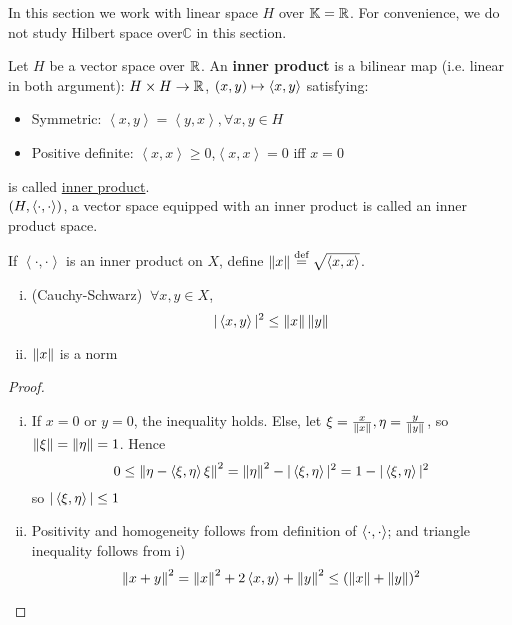 \documentclass{article}
\begin{document}
In this section we work with linear space $H$ over $\mathbb{K} = \mathbb{R}$. For convenience, we do not study Hilbert space over$\mathbb{ C}$ in this section.


\begin{definition}
	Let $H$ be a vector space over $\mathbb{R}$. An {\bf inner product} is a bilinear map (i.e. linear in both argument):
	$H\times H\to\mathbb{R}$, $(x,y)\mapsto \left<{x},{y}\right>$ satisfying:
	\begin{itemize}
		\item Symmetric: $\left<x,y\right>={{\left<y,x\right>}},\forall x,y\in H$
		\item Positive definite: $\left<x,x\right>\geq0$,$\left<x,x\right>=0$ iff $x=0$
	\end{itemize}
	is called \underline{inner product}.\\
	$(H,\left<{\cdot},{\cdot}\right>)$, a vector space equipped with an inner product is called an inner product space.
\end{definition}



\begin{theorem}
	If $\left<\cdot,\cdot\right>$ is an inner product on $X$, define $\left\|{x}\right\|\overset{\textrm{def}}{=}\sqrt{\left<{x},{x}\right>}$.
	\begin{enumerate}[i)]
		\item (Cauchy-Schwarz) $\ \forall x,y\in X$,
		      $$|\left<{x},{y}\right>|^2\leq \left\|{x}\right\| \left\|{y}\right\|$$
		\item $\left\|{x}\right\|$ is a norm
	\end{enumerate}
\end{theorem}

\begin{proof}
	\begin{enumerate}[i)]
		\item If $x=0$ or $y=0$, the inequality holds. Else, let $\xi = \frac{x}{\left\|{x}\right\|}, \eta = \frac{y}{\left\|{y}\right\|}$, so $\left\|{\xi}\right\|=\left\|{\eta}\right\|=1$. Hence
		      $$0 \leq \left\|{\eta-\left<{\xi},{\eta}\right>\xi}\right\|^2=\left\|{\eta}\right\|^2 - |\left<{\xi},{\eta}\right>|^2=1-|\left<{\xi},{\eta}\right>|^2$$
		      so $|\left<{\xi},{\eta}\right>| \leq 1$
		\item Positivity and homogeneity follows from definition of $\left<{\cdot},{\cdot}\right>$; and triangle inequality follows from i)
		      $$
			      \left\|{x+y}\right\|^2=\left\|{x}\right\|^2 + 2 \left<{x},{y}\right> + \left\|{y}\right\|^2 \leq (\left\|{x}\right\|+\left\|{y}\right\|)^2
		      $$
	\end{enumerate}
\end{proof}
\end{document}
